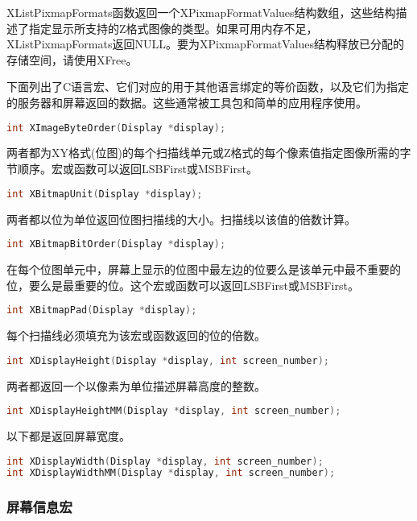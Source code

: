 \noindent XListPixmapFormats函数返回一个XPixmapFormatValues结构数组，这些结构描述了指定显示所支持的Z格式图像的类型。如果可用内存不足，XListPixmapFormats返回NULL。要为XPixmapFormatValues结构释放已分配的存储空间，请使用XFree。

\noindent 下面列出了C语言宏、它们对应的用于其他语言绑定的等价函数，以及它们为指定的服务器和屏幕返回的数据。这些通常被工具包和简单的应用程序使用。

\begin{lstlisting}[language=C]
int XImageByteOrder(Display *display);
\end{lstlisting}

\noindent 两者都为XY格式(位图)的每个扫描线单元或Z格式的每个像素值指定图像所需的字节顺序。宏或函数可以返回LSBFirst或MSBFirst。
\begin{lstlisting}[language=C]
int XBitmapUnit(Display *display);
\end{lstlisting}

\noindent 两者都以位为单位返回位图扫描线的大小。扫描线以该值的倍数计算。
\begin{lstlisting}[language=C]
int XBitmapBitOrder(Display *display);
\end{lstlisting}

\noindent 在每个位图单元中，屏幕上显示的位图中最左边的位要么是该单元中最不重要的位，要么是最重要的位。这个宏或函数可以返回LSBFirst或MSBFirst。
\begin{lstlisting}[language=C]
int XBitmapPad(Display *display);
\end{lstlisting}

\noindent 每个扫描线必须填充为该宏或函数返回的位的倍数。
\begin{lstlisting}[language=C]
int XDisplayHeight(Display *display, int screen_number);
\end{lstlisting}

\noindent 两者都返回一个以像素为单位描述屏幕高度的整数。
\begin{lstlisting}[language=C]
int XDisplayHeightMM(Display *display, int screen_number);
\end{lstlisting}

\noindent 以下都是返回屏幕宽度。
\begin{lstlisting}[language=C]
int XDisplayWidth(Display *display, int screen_number);
int XDisplayWidthMM(Display *display, int screen_number);
\end{lstlisting}

\subsubsection{屏幕信息宏}

